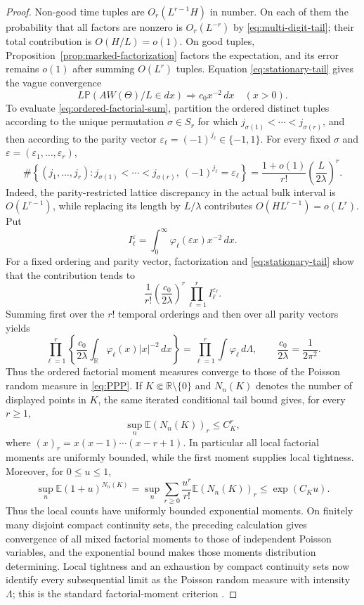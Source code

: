 \documentclass[11pt,a4paper]{amsart}
\theoremstyle{definition}
\theoremstyle{remark}
\newcommand{\R}{\mathbb R}
\newcommand{\E}{\mathbb E}
\newcommand{\Pp}{\mathbb P}
\begin{document}
\begin{proof}
Non-good time tuples are $O_r(L^{r-1}H)$ in number.  On each of them the
probability that all factors are nonzero is $O_r(L^{-r})$ by
\eqref{eq:multi-digit-tail}; their total contribution is $O(H/L)=o(1)$.
On good tuples, Proposition~\ref{prop:marked-factorization} factors the
expectation, and its error remains $o(1)$ after summing $O(L^r)$ tuples.
Equation \eqref{eq:stationary-tail} gives the vague convergence
\[
 L\Pp(AW(\Theta)/L\in dx)\Longrightarrow c_0x^{-2}\,dx
 \quad(x>0).
\]
To evaluate \eqref{eq:ordered-factorial-sum}, partition the ordered distinct
tuples according to the unique permutation $\sigma\in S_r$ for which
$j_{\sigma(1)}<\cdots<j_{\sigma(r)}$, and then according to the parity vector
$\varepsilon_\ell=(-1)^{j_\ell}\in\{-1,1\}$.  For every fixed
$\sigma$ and $\varepsilon=(\varepsilon_1,\ldots,\varepsilon_r)$,
\begin{equation}\label{eq:parity-tuple-count}
 \#\left\{(j_1,\ldots,j_r):
 j_{\sigma(1)}<\cdots<j_{\sigma(r)},\
 (-1)^{j_\ell}=\varepsilon_\ell\right\}
 =\frac{1+o(1)}{r!}\left(\frac{L}{2\lambda}\right)^r.
\end{equation}
Indeed, the parity-restricted lattice discrepancy in the actual bulk interval
is $O(L^{r-1})$, while replacing its length by $L/\lambda$ contributes
$O(HL^{r-1})=o(L^r)$.  Put
\[
 I_\ell^{\varepsilon}
 =\int_0^\infty\varphi_\ell(\varepsilon x)x^{-2}\,dx.
\]
For a fixed ordering and parity vector, factorization and
\eqref{eq:stationary-tail} show that the contribution tends to
\[
 \frac1{r!}\left(\frac{c_0}{2\lambda}\right)^r
 \prod_{\ell=1}^r I_\ell^{\varepsilon_\ell}.
\]
Summing first over the $r!$ temporal orderings and then over all parity
vectors yields
\[
 \prod_{\ell=1}^r
 \left\{\frac{c_0}{2\lambda}
 \int_{\R}\varphi_\ell(x)|x|^{-2}\,dx\right\}
 =\prod_{\ell=1}^r\int\varphi_\ell\,d\Lambda,
 \qquad \frac{c_0}{2\lambda}=\frac1{2\pi^2}.
\]
Thus the ordered factorial moment measures converge to those of the Poisson
random measure in \eqref{eq:PPP}.  If $K\Subset\R\setminus\{0\}$ and
$N_n(K)$ denotes the number of displayed points in $K$, the same iterated
conditional tail bound gives, for every $r\ge1$,
\[
 \sup_n\E (N_n(K))_r\le C_K^r,
\]
where $(x)_r=x(x-1)\cdots(x-r+1)$.  In particular all local factorial
moments are uniformly bounded, while the first moment supplies local
tightness.  Moreover, for $0\le u\le1$,
\[
 \sup_n\E(1+u)^{N_n(K)}
 =\sup_n\sum_{r\ge0}\frac{u^r}{r!}\E(N_n(K))_r
 \le \exp(C_Ku).
\]
Thus the local counts have uniformly bounded exponential moments.  On
finitely many disjoint compact continuity sets, the preceding calculation
gives convergence of all mixed factorial moments to those of independent
Poisson variables, and the exponential bound makes those moments
distribution determining.  Local tightness and an exhaustion by compact
continuity sets now identify every subsequential limit as the Poisson random
measure with intensity $\Lambda$; this is the standard factorial-moment
criterion \cite[Chap.~4]{Kallenberg17}.
\end{proof}
\end{document}
